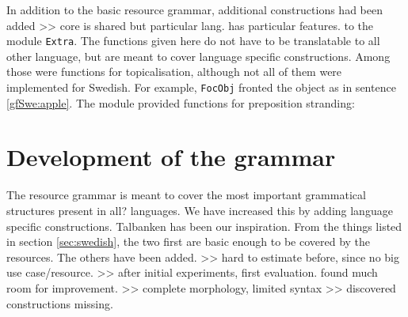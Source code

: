 \documentclass{report}
\begin{document}
In addition to the basic resource grammar, additional constructions had been added
>> core is shared but particular lang. has particular features.
to the module \verb|Extra|. The functions given here do not have to be translatable
to all other language, but are meant to cover language specific constructions.
Among those were functions for topicalisation, although not all
of them were implemented for Swedish.
For example, \verb|FocObj| fronted the object as in sentence \ref{gfSwe:apple}.
\label{gfSwe:apple}
The module provided functions for preposition stranding:






\section{Development of the grammar}
\label{sec:Added}
The resource grammar is meant to cover the most important grammatical structures
present in all? languages. We have increased this by adding language specific
constructions. Talbanken has been our inspiration.
From the things listed in section \ref{sec:swedish}, the two first are basic
enough to be covered by the resources. The others have been added.
>> hard to estimate before, since no big use case/resource.
>> after initial experiments, first evaluation. found much room for improvement. 
>> complete morphology, limited syntax
>> discovered constructions missing.
\end{document}
